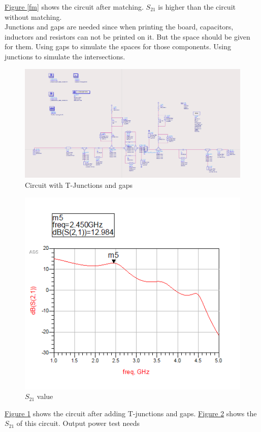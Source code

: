 \documentclass[12pt,a4paper]{report}
\begin{document}
\hyperref[fm]{Figure \ref*{fm}} shows the circuit after matching. $S_{21}$ is higher than the circuit without matching.\\
Junctions and gaps are needed since when printing the board, capacitors, inductors and resistors can not be printed on it. But the 
space should be given for them. Using gaps to simulate the spaces for those components. Using junctions to simulate the intersections.
\begin{figure}
    \centerline{\includegraphics[scale=0.5]{Junctions_Added.PNG}}
    \caption{Circuit with T-Junctions and gaps}
    \label{junctions}
\end{figure}
\begin{figure}
    \centerline{\includegraphics{Junctions_S21.PNG}}
    \caption{$S_{21}$ value}
    \label{S21}
\end{figure}
\hyperref[junctions]{Figure \ref*{junctions}} shows the circuit after adding T-junctions and gaps. \hyperref[S21]{Figure \ref*{S21}} shows the $S_{21}$ of this circuit. Output power test needs 
\end{document}
